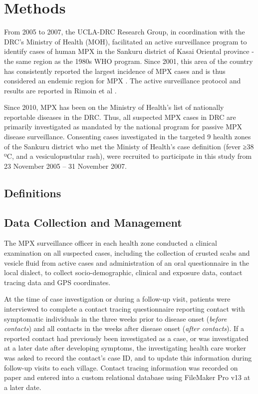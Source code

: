\section{Methods}

From 2005 to 2007, the UCLA-DRC Research Group, in coordination with the DRC’s Ministry of Health (MOH), facilitated an active surveillance program to identify cases of human MPX in the Sankuru district of Kasai Oriental province - the same region as the 1980s WHO program. Since 2001, this area of the country has consistently reported the largest incidence of MPX cases and is thus considered an endemic region for MPX \cite{Rimoin2010}. The active surveillance protocol and results are reported in Rimoin et al \cite{Rimoin2010}.

Since 2010, MPX has been on the Ministry of Health's list of nationally reportable diseases in the DRC. Thus, all suspected MPX cases in DRC are primarily investigated as mandated by the national program for passive MPX disease surveillance. Consenting cases investigated in the targeted 9 health zones of the Sankuru district who met the  Ministy of Health’s case definition (fever ≥38 ºC, and a vesiculopustular rash), were recruited to participate in this study from 23 November 2005 – 31 November 2007. 

\subsection{Definitions}


\subsection{Data Collection and Management}
The MPX surveillance officer in each health zone conducted a clinical examination on all suspected cases,
including the collection of crusted scabs and vesicle fluid from active cases and administration of an oral questionnaire in the local dialect, to collect socio-demographic, clinical and exposure data, contact tracing data and GPS coordinates.

At the time of case investigation or during a follow-up visit, patients were interviewed to complete a contact tracing questionnaire reporting contact with symptomatic individuals in the three weeks prior to disease onset  (\textit{before contacts}) and all contacts in the weeks after disease onset (\textit{after contacts}). If a reported contact had previously been investigated as a case, or was investigated at a later date after developing symptoms, the investigating health care worker was asked to record the contact's case ID, and to update this information during follow-up visits to each village. Contact tracing information was recorded on paper and entered into a custom relational database using FileMaker Pro v13 at a later date.

